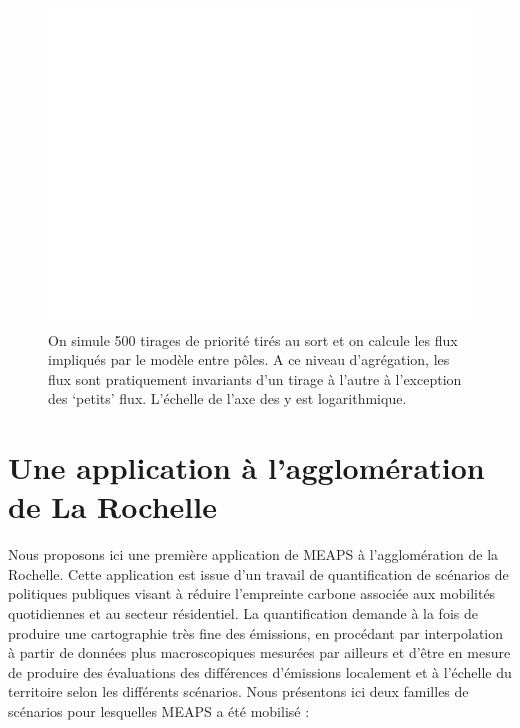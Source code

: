 \documentclass[
  10pt,
  a4paper,
  numbers=noendperiod,
  DIV=12]{scrartcl}
\begin{document}
\begin{figure}[htb]

{\centering \includegraphics[width=1\textwidth,height=\textheight]{output/gfluxs.png}

}

\caption[Flux entre pôles, distribution]{\label{fig-fluxerg}On simule
500 tirages de priorité tirés au sort et on calcule les flux impliqués
par le modèle entre pôles. A ce niveau d'agrégation, les flux sont
pratiquement invariants d'un tirage à l'autre à l'exception des `petits'
flux. L'échelle de l'axe des y est logarithmique.}

\end{figure}

\hypertarget{sec-rochelle}{%
\section{Une application à l'agglomération de La
Rochelle}\label{sec-rochelle}}

Nous proposons ici une première application de MEAPS à l'agglomération
de la Rochelle. Cette application est issue d'un travail de
quantification de scénarios de politiques publiques visant à réduire
l'empreinte carbone associée aux mobilités quotidiennes et au secteur
résidentiel. La quantification demande à la fois de produire une
cartographie très fine des émissions, en procédant par interpolation à
partir de données plus macroscopiques mesurées par ailleurs et d'être en
mesure de produire des évaluations des différences d'émissions
localement et à l'échelle du territoire selon les différents scénarios.
Nous présentons ici deux familles de scénarios pour lesquelles MEAPS a
été mobilisé :
\end{document}
